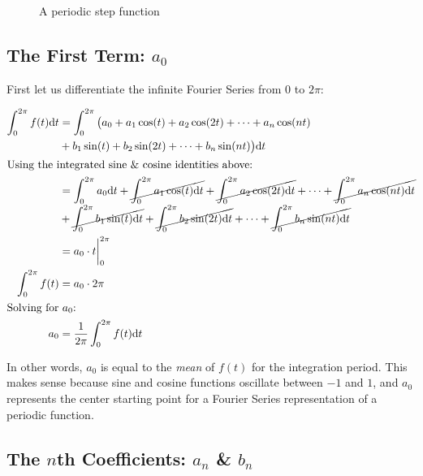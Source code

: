 \documentclass[10pt]{article} %
\begin{document}
\begin{figure}[h!]
    \caption{A periodic step function} %
    \label{fig:periodic_step_function} %
\end{figure}

\subsection*{The First Term: $a_0$}


First let us differentiate the infinite Fourier Series from $0$ to $2\pi$:

\begin{align*}
    \int_0^{2\pi} f(t) \mathrm{d}t & = \int_0^{2\pi} \big( a_0 + a_1\cos(t) + a_2\cos(2t) + \dots + a_n\cos(nt) \\
    & + b_1\sin(t) + b_2\sin(2t) + \dots + b_n\sin(nt)\big)\mathrm{d}t\\
    \intertext{Using the integrated sine \& cosine identities above:}
    & = \int_0^{2\pi} a_0 \mathrm{d}t + \cancel{\int_0^{2\pi} a_1\cos(t) \mathrm{d}t} + \cancel{\int_0^{2\pi} a_2\cos(2t) \mathrm{d}t} + \dots + \cancel{\int_0^{2\pi} a_n\cos(nt) \mathrm{d}t} \\
    & + \cancel{\int_0^{2\pi} b_1\sin(t) \mathrm{d}t} + \cancel{\int_0^{2\pi} b_2\sin(2t) \mathrm{d}t} + \dots + \cancel{\int_0^{2\pi} b_n\sin(nt) \mathrm{d}t} \\
    & = a_0 \cdot t \bigg\vert_0^{2\pi} \\
    \int_0^{2\pi} f(t) & = a_0 \cdot 2\pi \\
    \intertext{Solving for $a_0$:}
    a_0 & = \frac{1}{2\pi}\int_0^{2\pi} f(t) \mathrm{d}t
\end{align*} 

In other words, $a_0$ is equal to the \textit{mean} of $f(t)$ for the integration period. This makes sense because sine and cosine functions oscillate between $-1$ and $1$, and $a_0$ represents the center starting point for a Fourier Series representation of a periodic function.

\subsection*{The $n$th Coefficients: $a_n$ \& $b_n$}
\end{document}

